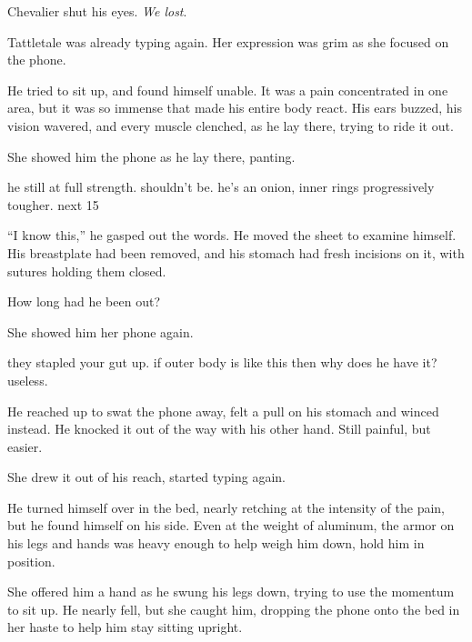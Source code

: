 Chevalier shut his eyes.  \emph{We lost}.



Tattletale was already typing again.  Her expression was grim as she focused on the phone.



He tried to sit up, and found himself unable.  It was a pain concentrated in one area, but it was so immense that made his entire body react.  His ears buzzed, his vision wavered, and every muscle clenched, as he lay there, trying to ride it out.



She showed him the phone as he lay there, panting.



he still at full strength.  shouldn't be.  he's an onion, inner rings progressively tougher.  next 15%



``I know this,'' he gasped out the words.  He moved the sheet to examine himself.  His breastplate had been removed, and his stomach had fresh incisions on it, with sutures holding them closed.



How long had he been out?



She showed him her phone again.



they stapled your gut up.  if outer body is like this then why does he have it?  useless.



He reached up to swat the phone away, felt a pull on his stomach and winced instead.  He knocked it out of the way with his other hand.  Still painful, but easier.



She drew it out of his reach, started typing again.



He turned himself over in the bed, nearly retching at the intensity of the pain, but he found himself on his side.  Even at the weight of aluminum, the armor on his legs and hands was heavy enough to help weigh him down, hold him in position.



She offered him a hand as he swung his legs down, trying to use the momentum to sit up.  He nearly fell, but she caught him, dropping the phone onto the bed in her haste to help him stay sitting upright.



